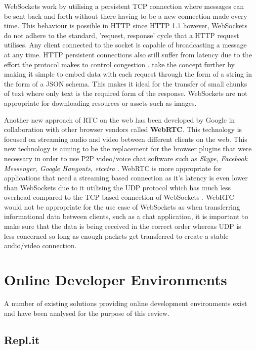 WebSockets work by utilising a persistent TCP connection where messages can be sent back and forth without there having to be a new connection made every time. This behaviour is possible in HTTP since HTTP 1.1 however, WebSockets do not adhere to the standard, 'request, response' cycle that a HTTP request utilises. Any client connected to the socket is capable of broadcasting a message at any time. HTTP persistent connections also still suffer from latency due to the effort the protocol makes to control congestion \cite{httpvsws}. take the concept further by making it simple to embed data with each request through the form of a string in the form of a JSON schema. This makes it ideal for the transfer of small chunks of text where only text is the required form of the response. WebSockets are not appropriate for downloading resources or assets such as images.

Another new approach of RTC on the web has been developed by Google in collaboration with other browser vendors called \textbf{WebRTC}. This technology is focused on streaming audio and video between different clients on the web. This new technology is aiming to be the replacement for the browser plugins that were necessary in order to use P2P video/voice chat software such as \textit{Skype, Facebook Messenger, Google Hangouts, etcetra} \cite{webrtc}. WebRTC is more appropriate for applications that need a streaming based connection as it's latency is even lower than WebSockets due to it utilising the UDP protocol which has much less overhead compared to the TCP based connection of WebSockets \cite{udpvstcp}. WebRTC would not be appropriate for the use case of WebSockets as when transferring informational data between clients, such as a chat application, it is important to make sure that the data is being received in the correct order whereas UDP is less concerned so long as enough packets get transferred to create a stable audio/video connection.


\section{Online Developer Environments} \label{lit-ode}

A number of existing solutions providing online development environments exist and have been analysed for the purpose of this review.

\subsection{Repl.it}

